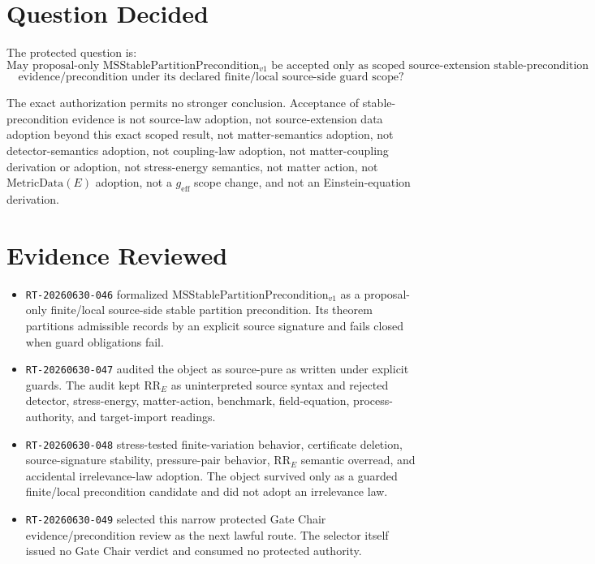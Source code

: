 \documentclass[11pt]{article}
\newcommand{\MSStablePre}{\mathrm{MSStablePartitionPrecondition}_{v1}}
\newcommand{\MetricData}{\mathrm{MetricData}}
\newcommand{\geff}{g_{\mathrm{eff}}}
\begin{document}
\section{Question Decided}

The protected question is:
\[
\text{May proposal-only } \MSStablePre
\text{ be accepted only as scoped source-extension stable-precondition}
\]
\[
\text{evidence/precondition under its declared finite/local source-side guard scope?}
\]

The exact authorization permits no stronger conclusion. Acceptance of
stable-precondition evidence is not source-law adoption, not source-extension
data adoption beyond this exact scoped result, not matter-semantics adoption,
not detector-semantics adoption, not coupling-law adoption, not
matter-coupling derivation or adoption, not stress-energy semantics, not
matter action, not \(\MetricData(E)\) adoption, not a \(\geff\) scope change,
and not an Einstein-equation derivation.

\section{Evidence Reviewed}

\begin{itemize}[leftmargin=*]
  \item \texttt{RT-20260630-046} formalized \(\MSStablePre\) as a
  proposal-only finite/local source-side stable partition precondition. Its
  theorem partitions admissible records by an explicit source signature and
  fails closed when guard obligations fail.
  \item \texttt{RT-20260630-047} audited the object as source-pure as written
  under explicit guards. The audit kept \(\mathrm{RR}_E\) as uninterpreted
  source syntax and rejected detector, stress-energy, matter-action,
  benchmark, field-equation, process-authority, and target-import readings.
  \item \texttt{RT-20260630-048} stress-tested finite-variation behavior,
  certificate deletion, source-signature stability, pressure-pair behavior,
  \(\mathrm{RR}_E\) semantic overread, and accidental irrelevance-law
  adoption. The object survived only as a guarded finite/local precondition
  candidate and did not adopt an irrelevance law.
  \item \texttt{RT-20260630-049} selected this narrow protected Gate Chair
  evidence/precondition review as the next lawful route. The selector itself
  issued no Gate Chair verdict and consumed no protected authority.
\end{itemize}
\end{document}
